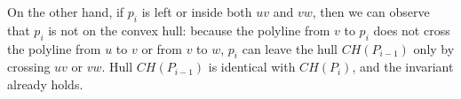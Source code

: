 
On the other hand, if $p_i$ is left or inside both $uv$ and $vw$, then we can 
observe that $p_i$ is not on the convex hull: because the polyline from $v$ to
$p_i$ does not cross the polyline from $u$ to $v$ or from $v$ to $w$, $p_i$ can
leave the hull $CH(P_{i-1})$ only by crossing $uv$ or $vw$. Hull $CH(P_{i-1})$
is identical with $CH(P_i)$, and the invariant already holds.




% 

 
